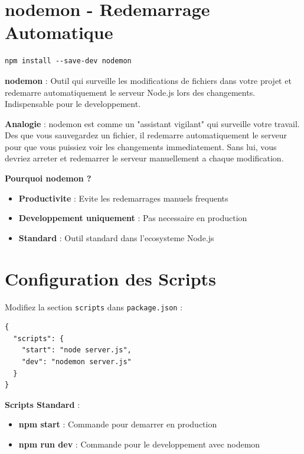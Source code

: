 \documentclass[a4paper,12pt]{book}
\begin{document}
\section{nodemon - Redemarrage Automatique}

\begin{lstlisting}[style=bash, caption=Installation de nodemon (dependance de developpement)]
npm install --save-dev nodemon
\end{lstlisting}

\begin{definitionbox}
    \textbf{nodemon} : Outil qui surveille les modifications de fichiers dans votre projet et redemarre automatiquement le serveur Node.js lors des changements. Indispensable pour le developpement.
\end{definitionbox}

\begin{analogybox}
    \textbf{Analogie} : nodemon est comme un "assistant vigilant" qui surveille votre travail. Des que vous sauvegardez un fichier, il redemarre automatiquement le serveur pour que vous puissiez voir les changements immediatement. Sans lui, vous devriez arreter et redemarrer le serveur manuellement a chaque modification.
\end{analogybox}

\textbf{Pourquoi nodemon ?}
\begin{itemize}
    \item \textbf{Productivite} : Evite les redemarrages manuels frequents
    \item \textbf{Developpement uniquement} : Pas necessaire en production
    \item \textbf{Standard} : Outil standard dans l'ecosysteme Node.js
\end{itemize}

\section{Configuration des Scripts}

Modifiez la section \texttt{scripts} dans \texttt{package.json} :

\begin{lstlisting}[style=javascript, caption=Configuration des scripts dans package.json]
{
  "scripts": {
    "start": "node server.js",
    "dev": "nodemon server.js"
  }
}
\end{lstlisting}

\begin{bestpracticebox}
    \textbf{Scripts Standard} :
    \begin{itemize}
        \item \textbf{npm start} : Commande pour demarrer en production
        \item \textbf{npm run dev} : Commande pour le developpement avec nodemon
    \end{itemize}
\end{bestpracticebox}
\end{document}
